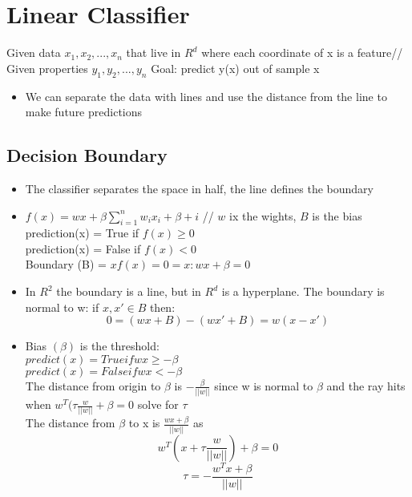 \documentclass{article}
\begin{document}
\section{Linear Classifier}
Given data $x_1, x_2, ..., x_n$ that live in $R^d$ where each coordinate of x is a feature//
Given properties $y_1, y_2, ... , y_n$
Goal: predict y(x) out of sample x
\begin{itemize}
\item We can separate the data with lines and use the distance from the line to make future predictions
\end{itemize}
\subsection{Decision Boundary}
\begin{itemize}
\item The classifier separates the space in half, the line defines the boundary
\item $f(x) = wx + \beta \sum_{i=1}^n w_ix_i + \beta+i$ //
$w$ ix the wights, $B$ is the bias \\
prediction(x) = True if $f(x) \geq 0$ \\
prediction(x) = False if $f(x) < 0$ \\
Boundary (B) = ${x f(x) = 0} = {x: wx + \beta = 0}$
\end{itemize}
\begin{itemize}
\item In $R^2$ the boundary is a line, but in $R^d$ is a hyperplane. The boundary is normal to w: if $x,x' \in B$ then:
$$0 = (wx+B)-(wx'+B) = w(x-x')$$
\item Bias $(\beta)$ is the threshold:\\
$predict(x) = True if wx \geq - \beta$ \\
$predict(x) = False if wx < - \beta$ \\
The distance from origin to $\beta$ is $-\frac{\beta}{||w||}$ since w is normal to $\beta$ and the ray hits when $w^T(\tau \frac{w}{||w||} + \beta = 0$ solve for $\tau$  \\
The distance from $\beta$ to x is $\frac{wx + \beta}{||w||}$ as 
$$w^T(x + \tau \frac{w}{||w||}) + \beta = 0$$
$$\tau = -\frac{w^Tx + \beta}{||w||}$$
\end{itemize}
\end{document}
